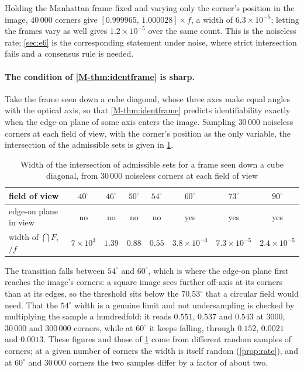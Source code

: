 Holding the Manhattan frame fixed and varying only the corner's position in the image, $40\,000$ corners give $[0.999965,\,1.000028]\times f$, a width of $6.3\times10^{-5}$; letting the frames vary as well gives $1.2\times10^{-5}$ over the same count. This is the noiseless rate; \cref{sec:e6} is the corresponding statement under noise, where strict intersection fails and a consensus rule is needed.

\paragraph{The condition of \cref{M-thm:identframe} is sharp.} Take the frame seen down a cube diagonal, whose three axes make equal angles with the optical axis, so that \cref{M-thm:identframe} predicts identifiability exactly when the edge-on plane of some axis enters the image. Sampling $30\,000$ noiseless corners at each field of view, with the corner's position as the only variable, the intersection of the admissible sets is given in \cref{tab:sharp}.

\begin{table}[t]
\centering\small
\caption{Width of the intersection of admissible sets for a frame seen down a cube diagonal, from $30\,000$ noiseless corners at each field of view}
\label{tab:sharp}
\begin{tabular}{lccccccc}
\toprule
field of view & $40^\circ$ & $46^\circ$ & $50^\circ$ & $54^\circ$ & $60^\circ$ & $73^\circ$ & $90^\circ$\\
\midrule
edge-on plane in view & no & no & no & no & yes & yes & yes\\
width of $\bigcap F$, $/f$ & $7\times10^{3}$ & $1.39$ & $0.88$ & $0.55$ & $3.8\times10^{-3}$ & $7.3\times10^{-5}$ & $2.4\times10^{-5}$\\
\bottomrule
\end{tabular}
\end{table}

The transition falls between $54^\circ$ and $60^\circ$, which is where the edge-on plane first reaches the image's corners: a square image sees further off-axis at its corners than at its edges, so the threshold sits below the $70.53^\circ$ that a circular field would need. That the $54^\circ$ width is a genuine limit and not undersampling is checked by multiplying the sample a hundredfold: it reads $0.551$, $0.537$ and $0.543$ at $3000$, $30\,000$ and $300\,000$ corners, while at $60^\circ$ it keeps falling, through $0.152$, $0.0021$ and $0.0013$. These figures and those of \cref{tab:sharp} come from different random samples of corners; at a given number of corners the width is itself random (\cref{prop:rate}), and at $60^\circ$ and $30\,000$ corners the two samples differ by a factor of about two.


